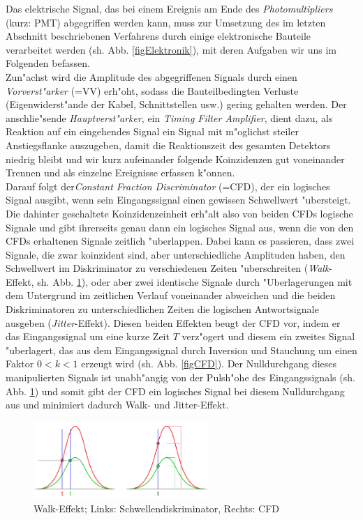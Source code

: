 \documentclass{article}
\begin{document}
Das elektrische Signal, das bei einem Ereignis am Ende des \textit{Photomultipliers} (kurz: PMT) abgegriffen werden kann, muss zur Umsetzung des im letzten Abschnitt beschriebenen Verfahrens durch einige elektronische Bauteile verarbeitet werden (sh. Abb. \ref{figElektronik}), mit deren Aufgaben wir uns im Folgenden befassen.\\
Zun"achst wird die Amplitude des abgegriffenen Signals durch einen \textit{Vorverst"arker} (=VV) erh"oht, sodass die Bauteilbedingten Verluste (Eigenwiderst"ande der Kabel, Schnittstellen usw.) gering gehalten werden. Der anschlie"sende \textit{Hauptverst"arker}, ein \textit{Timing Filter Amplifier}, dient dazu, als Reaktion auf ein eingehendes Signal ein Signal mit m"oglichst steiler Anstiegsflanke auszugeben, damit die Reaktionszeit des gesamten Detektors niedrig bleibt und wir kurz aufeinander folgende Koinzidenzen gut voneinander Trennen und als einzelne Ereignisse erfassen k"onnen.\\
Darauf folgt der\textit{Constant Fraction Discriminator} (=CFD), der ein logisches Signal ausgibt, wenn sein Eingangssignal einen gewissen Schwellwert "ubersteigt. Die dahinter geschaltete Koinzidenzeinheit erh"alt also von beiden CFDs logische Signale und gibt ihrerseits genau dann ein logisches Signal aus, wenn die von den CFDs erhaltenen Signale zeitlich "uberlappen. Dabei kann es passieren, dass zwei Signale, die zwar koinzident sind, aber unterschiedliche Amplituden haben, den Schwellwert im Diskriminator zu verschiedenen Zeiten "uberschreiten (\textit{Walk}-Effekt, sh. Abb. \ref{figWalkDerHurensohn}), oder aber zwei identische Signale durch "Uberlagerungen mit dem Untergrund im zeitlichen Verlauf voneinander abweichen und die beiden Diskriminatoren zu unterschiedlichen Zeiten die logischen Antwortsignale ausgeben (\textit{Jitter}-Effekt). Diesen beiden Effekten beugt der CFD vor, indem er das Eingangssignal um eine kurze Zeit $T$ verz"ogert und diesem ein zweites Signal "uberlagert, das aus dem Eingangssignal durch Inversion und Stauchung um einen Faktor $0<k<1$ erzeugt wird (sh. Abb. \ref{figCFD}). Der Nulldurchgang dieses manipulierten Signals ist unabh"angig von der Pulsh"ohe des Eingangssignals (sh. Abb. \ref{figWalkDerHurensohn}) und somit gibt der CFD ein logisches Signal bei diesem Nulldurchgang aus und minimiert dadurch Walk- und Jitter-Effekt.


\begin{figure}[!ht]
	\centering
	\includegraphics[width=250px, totalheight=250px, keepaspectratio]{Walk.PNG}
	\caption[Walk-Effekt; Links: Schwellendiskriminator, Rechts: CFD]{Walk-Effekt; Links: Schwellendiskriminator, Rechts: CFD\footnotemark}
	\label{figWalkDerHurensohn}
\end{figure}
\end{document}
